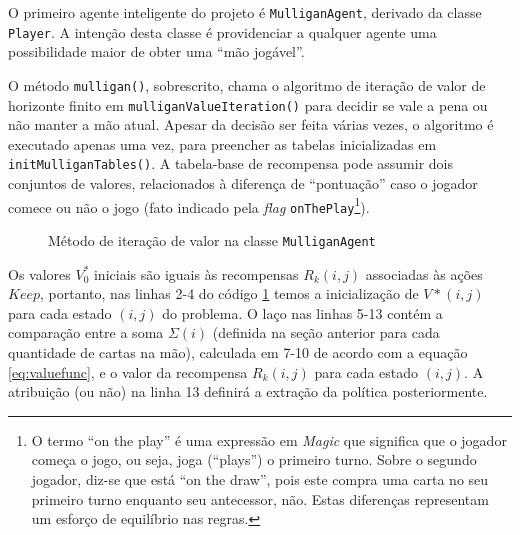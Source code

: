 O primeiro agente inteligente do projeto é \texttt{MulliganAgent}, derivado da classe \texttt{Player}. A intenção desta classe é providenciar a qualquer agente uma possibilidade maior de obter uma ``mão jogável''.



O método \texttt{mulligan()}, sobrescrito, chama o algoritmo de iteração de valor de horizonte finito em \texttt{mulliganValueIteration()} para decidir se vale a pena ou não manter a mão atual. Apesar da decisão ser feita várias vezes, o algoritmo é executado apenas uma vez, para preencher as tabelas inicializadas em \texttt{initMulliganTables()}. A tabela-base de recompensa pode assumir dois conjuntos de valores, relacionados à diferença de ``pontuação'' caso o jogador comece ou não o jogo (fato indicado pela \textit{flag} \texttt{onThePlay}\footnote{O termo ``on the play'' é uma expressão em \textit{Magic} que significa que o jogador começa o jogo, ou seja, joga (``plays'') o primeiro turno. Sobre o segundo jogador, diz-se que está ``on the draw'', pois este compra uma carta no seu primeiro turno enquanto seu antecessor, não. Estas diferenças representam um esforço de equilíbrio nas regras.}).
\begin{figure}[h!]
  
  \label{code:valueit}
  \caption{Método de iteração de valor na classe \texttt{MulliganAgent}}
\end{figure}

Os valores $V^*_0$ iniciais são iguais às recompensas $R_k(i,j)$ associadas às ações $Keep$, portanto, nas linhas 2-4 do código \ref{code:valueit} temos a inicialização de $V*(i, j)$ para cada estado $(i, j)$ do problema. O laço nas linhas 5-13 contém a comparação entre a soma $\Sigma(i)$ (definida na seção anterior para cada quantidade de cartas na mão), calculada em 7-10 de acordo com a equação \ref{eq:valuefunc}, e o valor da recompensa $R_k(i, j)$ para cada estado $(i, j)$. A atribuição (ou não) na linha 13 definirá a extração da política posteriormente.

\newpage

